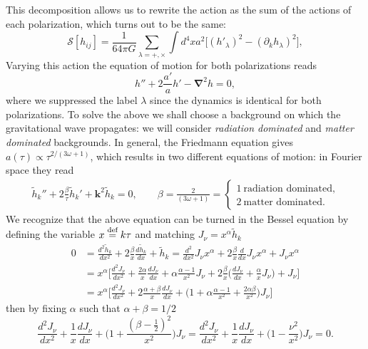 This decomposition allows us to rewrite the action as the sum of the actions of each polarization, which turns out to be the same:
\begin{equation*}
    \mathcal{S} [h_{ij}]=\frac{1}{64\pi G}\sum_{\lambda=+,\times}\int d^4xa^2\Big[(h'_{\lambda})^2-(\partial_k h_{\lambda})^2\Big],
\end{equation*}
Varying this action the equation of motion for both polarizations reads
\begin{equation}
    h''+2\frac{a'}{a}h'-\boldsymbol{\nabla}^2h=0,\label{eq:EOM_GW_FREE}
\end{equation} 
where we suppressed the label $\lambda$ since the dynamics is identical for both polarizations. To solve the above we shall choose a background on which the gravitational wave propagates: we will consider \emph{radiation dominated} and \emph{matter dominated}  backgrounds. In general, the Friedmann equation gives $a(\tau)\propto\tau^{2/(3\omega+1)}$, which results in two different equations of motion: in Fourier space they read
\begin{align}
    \tilde h_k''+2\frac{\beta}{\tau}\tilde h_k'+\boldsymbol{k}^2\tilde h_k=0,\qquad \beta=\frac{2}{(3\omega+1)}=\begin{cases}
        1\ \text{radiation dominated,}\\
        2\ \text{matter dominated.}
    \end{cases}\label{eq:GW_Fourier}
\end{align}
We recognize that the above equation can be turned in the Bessel equation by defining the variable $x\stackrel{\text{def}}{=} k\tau$ and matching $J_\nu=x^\alpha\tilde h_k$
\begin{align*}
    0&=\frac{d^2\tilde h_k}{dx^2}+2\frac{\beta}{x}\frac{d\tilde h_k}{dx}+\tilde h_k=\frac{d^2}{dx^2}J_\nu x^\alpha+2\frac{\beta}{x}\frac{d}{dx}J_\nu x^\alpha+J_\nu x^\alpha\\ &=x^\alpha\bigg[\frac{d^2J_\nu}{dx^2}+\frac{2\alpha}{x}\frac{dJ_\nu}{dx}+\alpha\frac{\alpha-1}{x^2}J_\nu+2\frac{\beta}{x}\bigg(\frac{dJ_\nu}{dx}+\frac{\alpha}{x}J_\nu\bigg)+J_\nu\bigg]\\
    &=x^\alpha\bigg[\frac{d^2J_\nu}{dx^2}+2\frac{\alpha+\beta}{x}\frac{dJ_\nu}{dx}+\bigg(1+\alpha\frac{\alpha-1}{x^2}+\frac{2\alpha\beta}{x^2}\bigg)J_\nu\bigg]
\end{align*}
then by fixing $\alpha$ such that $\alpha+\beta=1/2$ 
$$\frac{d^2J_\nu}{dx^2}+\frac{1}{x}\frac{dJ_\nu}{dx}+\bigg(1+\frac{(\beta-\frac{1}{2})^2}{x^2}\bigg)J_\nu=\frac{d^2J_\nu}{dx^2}+\frac{1}{x}\frac{dJ_\nu}{dx}+\bigg(1-\frac{\nu^2}{x^2}\bigg)J_\nu=0.$$
